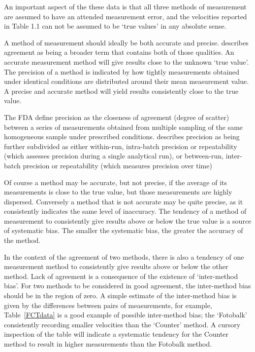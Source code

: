 \documentclass[Main.tex]{subfiles}
\begin{document}
An important aspect of the these data is that all three methods of
measurement are assumed to have an attended measurement error, and
the velocities reported in Table 1.1 can not be assumed to be
`true values' in any absolute sense.







A method of measurement should ideally be both accurate and
precise. \citet{Barnhart} describes agreement as being a broader
term that contains both of those qualities. An accurate
measurement method will give results close to the unknown `true
value'. The precision of a method is indicated by how tightly
measurements obtained under identical conditions are distributed
around their mean measurement value. A precise and accurate method
will yield results consistently close to the true value.

The FDA define precision as the closeness of agreement (degree of
	scatter) between a series of measurements obtained from multiple
	sampling of the same homogeneous sample under prescribed
	conditions. \citet{Barnhart} describes precision as being further
	subdivided as either within-run, intra-batch precision or
	repeatability (which assesses precision during a single analytical
	run), or between-run, inter-batch precision or repeatability
	(which measures precision over time)

Of course
a method may be accurate, but not precise, if the average of its
measurements is close to the true value, but those measurements
are highly dispersed. Conversely a method that is not accurate may
be quite precise, as it consistently indicates the same level of
inaccuracy. The tendency of a method of measurement to
consistently give results above or below the true value is a
source of systematic bias. The smaller the systematic bias, the
greater the accuracy of the method.


In the context of the agreement of two methods, there is also a
tendency of one measurement method to consistently give results
above or below the other method. Lack of agreement is a
consequence of the existence of `inter-method bias'. For two
methods to be considered in good agreement, the inter-method bias
should be in the region of zero. A simple estimate of the
inter-method bias is given by the differences between pairs of measurements, for example,  Table~\ref{FCTdata} is a good example of
possible inter-method bias; the `Fotobalk' consistently recording
smaller velocities than the `Counter' method. A cursory inspection of the table will indicate a systematic tendency for the Counter method to result in higher measurements than the Fotobalk method. %
\end{document}
